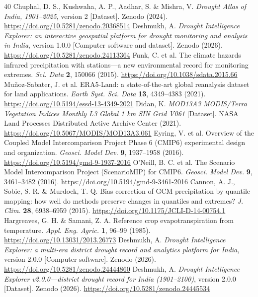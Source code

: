 \documentclass[10pt,a4paper]{article}
\begin{document}
\begin{thebibliography}{40}
 Chuphal, D. S., Kushwaha, A. P., Aadhar, S. \& Mishra, V. \textit{Drought Atlas of India, 1901--2025}, version 2 [Dataset]. Zenodo (2024). \url{https://doi.org/10.5281/zenodo.20368514}
 Deshmukh, A. \textit{Drought Intelligence Explorer: an interactive geospatial platform for drought monitoring and analysis in India}, version 1.0.0 [Computer software and dataset]. Zenodo (2026). \url{https://doi.org/10.5281/zenodo.24113364}
 Funk, C. et al. The climate hazards infrared precipitation with stations---a new environmental record for monitoring extremes. \textit{Sci. Data} \textbf{2}, 150066 (2015). \url{https://doi.org/10.1038/sdata.2015.66}
 Mu\~{n}oz-Sabater, J. et al. ERA5-Land: a state-of-the-art global reanalysis dataset for land applications. \textit{Earth Syst. Sci. Data} \textbf{13}, 4349--4383 (2021). \url{https://doi.org/10.5194/essd-13-4349-2021}
 Didan, K. \textit{MOD13A3 MODIS/Terra Vegetation Indices Monthly L3 Global 1 km SIN Grid V061} [Dataset]. NASA Land Processes Distributed Active Archive Center (2021). \url{https://doi.org/10.5067/MODIS/MOD13A3.061}
 Eyring, V. et al. Overview of the Coupled Model Intercomparison Project Phase 6 (CMIP6) experimental design and organization. \textit{Geosci. Model Dev.} \textbf{9}, 1937--1958 (2016). \url{https://doi.org/10.5194/gmd-9-1937-2016}
 O'Neill, B. C. et al. The Scenario Model Intercomparison Project (ScenarioMIP) for CMIP6. \textit{Geosci. Model Dev.} \textbf{9}, 3461--3482 (2016). \url{https://doi.org/10.5194/gmd-9-3461-2016}
 Cannon, A. J., Sobie, S. R. \& Murdock, T. Q. Bias correction of GCM precipitation by quantile mapping: how well do methods preserve changes in quantiles and extremes? \textit{J. Clim.} \textbf{28}, 6938--6959 (2015). \url{https://doi.org/10.1175/JCLI-D-14-00754.1}
 Hargreaves, G. H. \& Samani, Z. A. Reference crop evapotranspiration from temperature. \textit{Appl. Eng. Agric.} \textbf{1}, 96--99 (1985). \url{https://doi.org/10.13031/2013.26773}
 Deshmukh, A. \textit{Drought Intelligence Explorer: a multi-era district drought record and analytics platform for India}, version 2.0.0 [Computer software]. Zenodo (2026). \url{https://doi.org/10.5281/zenodo.24444860}
 Deshmukh, A. \textit{Drought Intelligence Explorer v2.0.0---district drought record for India (1901--2100)}, version 2.0.0 [Dataset]. Zenodo (2026). \url{https://doi.org/10.5281/zenodo.24445534}

\end{thebibliography}
\end{document}
